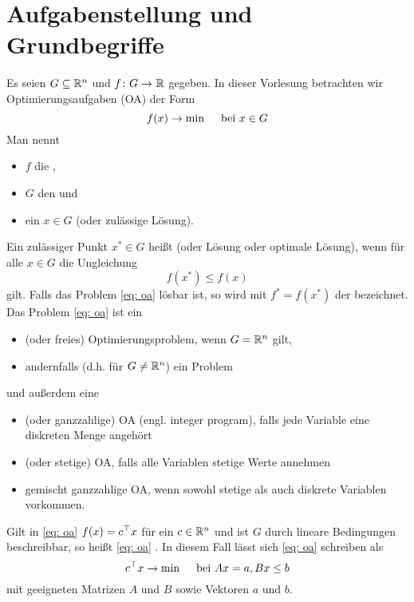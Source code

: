 \section{Aufgabenstellung und Grundbegriffe}

Es seien $G \subseteq \mathbb{R}^n$ und $\abb{f}{G}{\R}$ gegeben. In dieser Vorlesung betrachten wir Optimierungsaufgaben (OA) der Form
\begin{equation}\label{eq: oa}
	f(x) \to \min \quad \text{ bei } x \in G
\end{equation}
Man nennt
\begin{itemize}[nolistsep, topsep=-\parskip]
	\item $f$ die ,
	\item $G$ den  und
	\item ein $x \in  G$  (oder zulässige Lösung).
\end{itemize}
Ein zulässiger Punkt $x^\ast \in G$ heißt  (oder Lösung oder optimale Lösung), wenn für alle $x \in G$ die Ungleichung
\begin{equation} \label{eq: 1_2_optimal}
	f(x^\ast) \le f(x)
\end{equation}
gilt. Falls das Problem \eqref{eq: oa} lösbar ist, so wird mit $f^\ast = f(x^\ast)$ der  bezeichnet. Das Problem \eqref{eq: oa} ist ein
\begin{itemize}[nolistsep, topsep=-\parskip]
	\item {} (oder freies) Optimierungsproblem, wenn $G = \mathbb{R}^n$ gilt,
	\item andernfalls (d.h. für $G \neq \mathbb{R}^n$) ein  Problem
\end{itemize}
und außerdem eine
\begin{itemize}[nolistsep, topsep=-\parskip]
	\item {} (oder ganzzahlige) OA (engl. integer program), falls jede Variable eine diskreten Menge angehört
	\item {} (oder stetige) OA, falls alle Variablen stetige Werte annehmen
	\item gemischt ganzzahlige OA, wenn sowohl stetige als auch diskrete Variablen vorkommen.
\end{itemize}

Gilt in \eqref{eq: oa} $f(x) = c^{\top} x$ für ein $c \in \mathbb{R}^n$ und ist $G$ durch lineare Bedingungen beschreibbar, so heißt \eqref{eq: oa} . In diesem Fall lässt sich \eqref{eq: oa} schreiben als
\begin{equation} \label{eq: 1_3_lineareOA}
	c^{\top} x \to \min \quad \text{ bei } Ax = a, Bx \le b
\end{equation}
mit geeigneten Matrizen $A$ und $B$ sowie Vektoren $a$ und $b$.

